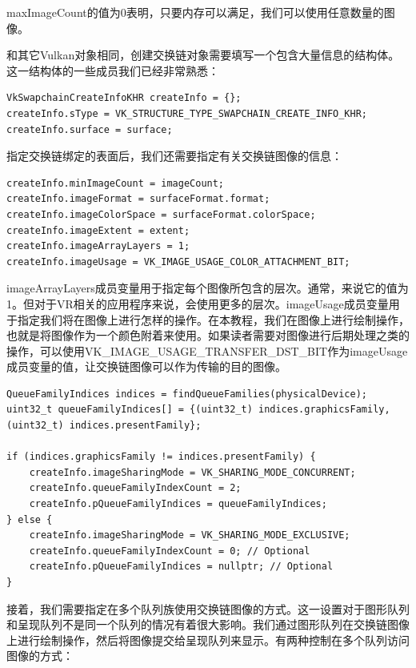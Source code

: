 \documentclass{ctexart}
\begin{document}
maxImageCount的值为0表明，只要内存可以满足，我们可以使用任意数量的图像。

和其它Vulkan对象相同，创建交换链对象需要填写一个包含大量信息的结构体。这一结构体的一些成员我们已经非常熟悉：

\begin{lstlisting}[language={[ANSI]C}]
VkSwapchainCreateInfoKHR createInfo = {};
createInfo.sType = VK_STRUCTURE_TYPE_SWAPCHAIN_CREATE_INFO_KHR;
createInfo.surface = surface;
\end{lstlisting}

指定交换链绑定的表面后，我们还需要指定有关交换链图像的信息：

\begin{lstlisting}[language={[ANSI]C}]
createInfo.minImageCount = imageCount;
createInfo.imageFormat = surfaceFormat.format;
createInfo.imageColorSpace = surfaceFormat.colorSpace;
createInfo.imageExtent = extent;
createInfo.imageArrayLayers = 1;
createInfo.imageUsage = VK_IMAGE_USAGE_COLOR_ATTACHMENT_BIT;
\end{lstlisting}

imageArrayLayers成员变量用于指定每个图像所包含的层次。通常，来说它的值为1。但对于VR相关的应用程序来说，会使用更多的层次。imageUsage成员变量用于指定我们将在图像上进行怎样的操作。在本教程，我们在图像上进行绘制操作，也就是将图像作为一个颜色附着来使用。如果读者需要对图像进行后期处理之类的操作，可以使用VK\_IMAGE\_USAGE\_TRANSFER\_DST\_BIT作为imageUsage成员变量的值，让交换链图像可以作为传输的目的图像。

\begin{lstlisting}[language={[ANSI]C}]
QueueFamilyIndices indices = findQueueFamilies(physicalDevice);
uint32_t queueFamilyIndices[] = {(uint32_t) indices.graphicsFamily, (uint32_t) indices.presentFamily};

if (indices.graphicsFamily != indices.presentFamily) {
	createInfo.imageSharingMode = VK_SHARING_MODE_CONCURRENT;
	createInfo.queueFamilyIndexCount = 2;
	createInfo.pQueueFamilyIndices = queueFamilyIndices;
} else {
	createInfo.imageSharingMode = VK_SHARING_MODE_EXCLUSIVE;
	createInfo.queueFamilyIndexCount = 0; // Optional
	createInfo.pQueueFamilyIndices = nullptr; // Optional
}
\end{lstlisting}

接着，我们需要指定在多个队列族使用交换链图像的方式。这一设置对于图形队列和呈现队列不是同一个队列的情况有着很大影响。我们通过图形队列在交换链图像上进行绘制操作，然后将图像提交给呈现队列来显示。有两种控制在多个队列访问图像的方式：
\end{document}
